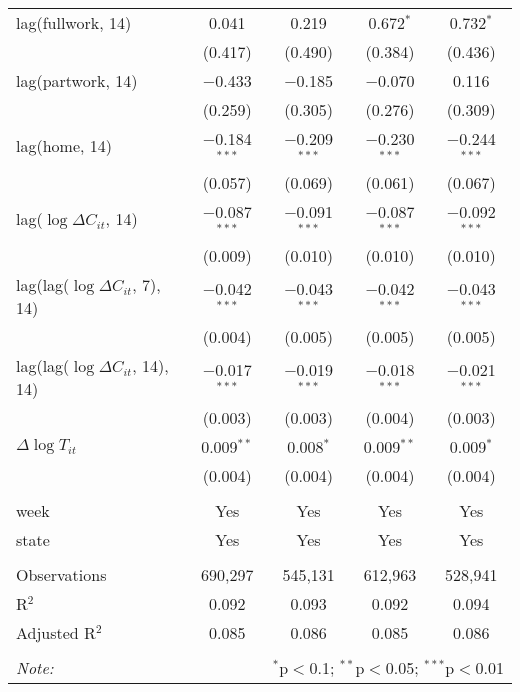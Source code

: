 \begin{tabular}{@{\extracolsep{1pt}}lcccc}
  lag(fullwork, 14) & 0.041 & 0.219 & 0.672$^{*}$ & 0.732$^{*}$ \\ 
  & (0.417) & (0.490) & (0.384) & (0.436) \\ 
  lag(partwork, 14) & $-$0.433 & $-$0.185 & $-$0.070 & 0.116 \\ 
  & (0.259) & (0.305) & (0.276) & (0.309) \\ 
  lag(home, 14) & $-$0.184$^{***}$ & $-$0.209$^{***}$ & $-$0.230$^{***}$ & $-$0.244$^{***}$ \\ 
  & (0.057) & (0.069) & (0.061) & (0.067) \\ 
  lag($\log \Delta C_{it}$, 14) & $-$0.087$^{***}$ & $-$0.091$^{***}$ & $-$0.087$^{***}$ & $-$0.092$^{***}$ \\ 
  & (0.009) & (0.010) & (0.010) & (0.010) \\ 
  lag(lag($\log \Delta C_{it}$, 7), 14) & $-$0.042$^{***}$ & $-$0.043$^{***}$ & $-$0.042$^{***}$ & $-$0.043$^{***}$ \\ 
  & (0.004) & (0.005) & (0.005) & (0.005) \\ 
  lag(lag($\log \Delta C_{it}$, 14), 14) & $-$0.017$^{***}$ & $-$0.019$^{***}$ & $-$0.018$^{***}$ & $-$0.021$^{***}$ \\ 
  & (0.003) & (0.003) & (0.004) & (0.003) \\ 
  $\Delta \log T_{it}$ & 0.009$^{**}$ & 0.008$^{*}$ & 0.009$^{**}$ & 0.009$^{*}$ \\ 
  & (0.004) & (0.004) & (0.004) & (0.004) \\ 
 \hline \\[-1.8ex] 
week & Yes & Yes & Yes & Yes \\ 
state & Yes & Yes & Yes & Yes \\ 
\hline \\[-1.8ex] 
Observations & 690,297 & 545,131 & 612,963 & 528,941 \\ 
R$^{2}$ & 0.092 & 0.093 & 0.092 & 0.094 \\ 
Adjusted R$^{2}$ & 0.085 & 0.086 & 0.085 & 0.086 \\ 
\hline 
\hline \\[-1.8ex] 
\textit{Note:}  & \multicolumn{4}{r}{$^{*}$p$<$0.1; $^{**}$p$<$0.05; $^{***}$p$<$0.01} \\ 
\end{tabular} 